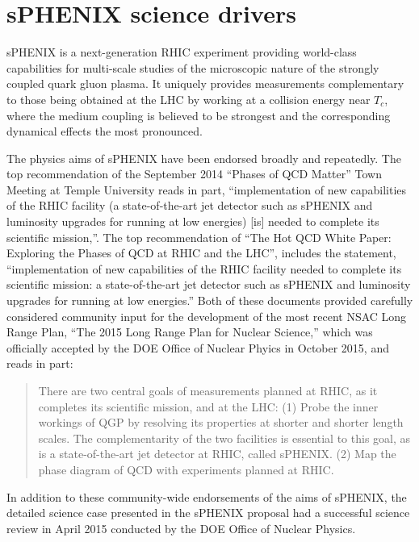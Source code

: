 \section{sPHENIX science drivers}

sPHENIX is a next-generation RHIC experiment providing world-class
capabilities for multi-scale studies of the microscopic nature
of the strongly coupled quark gluon plasma.
It uniquely provides measurements complementary to those being
obtained at the LHC by working at a collision energy near $T_c$, where
the medium coupling is believed to be strongest and the corresponding
dynamical effects the most pronounced.

The physics aims of sPHENIX have been endorsed broadly and repeatedly.
The top recommendation of the September 2014 “Phases of QCD Matter”
Town Meeting at Temple University reads in part, ``implementation of
new capabilities of the RHIC facility (a state-of-the-art jet detector
such as sPHENIX and luminosity upgrades for running at low energies)
[is] needed to complete its scientific mission,''.  The top
recommendation of ``The Hot QCD White Paper: Exploring the Phases of
QCD at RHIC and the LHC'', includes the statement, ``implementation of
new capabilities of the RHIC facility needed to complete its
scientific mission: a state-of-the-art jet detector such as sPHENIX
and luminosity upgrades for running at low energies.'' Both of these
documents provided carefully considered community input for the
development of the most recent NSAC Long Range Plan, ``The 2015 Long
Range Plan for Nuclear Science,'' which was officially accepted by the
DOE Office of Nuclear Phyics in October 2015, and reads in part:

\blockquote{There are two central goals of measurements planned at
  RHIC, as it completes its scientific mission, and at the LHC: (1)
  Probe the inner workings of QGP by resolving its properties at
  shorter and shorter length scales. The complementarity of the two
  facilities is essential to this goal, as is a state-of-the-art jet
  detector at RHIC, called sPHENIX. (2) Map the phase diagram of QCD
  with experiments planned at RHIC.}

In addition to these community-wide endorsements of the aims of
sPHENIX, the detailed science case presented in the sPHENIX proposal
had a successful science review in April 2015 conducted by the DOE
Office of Nuclear Physics.


